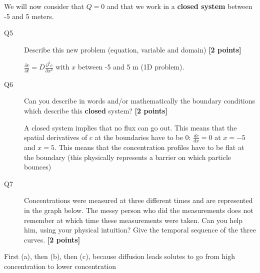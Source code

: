 \documentclass{article}
\newcommand{\ans}[1]{\textcolor{dark-green}{#1}}
\begin{document}
We will now consider that $Q=0$ and that we work in a \textbf{closed system} between -5 and 5 meters. 


\begin{description}
\item [Q5] Describe this new problem (equation, variable and domain) \textbf{[2 points]}

\ans{$\frac{\partial c}{\partial t} = D  \frac{\partial^2 c}{\partial x^2}   $ with $x$ between -5 and 5 m (1D problem). }


\item [Q6] Can you describe in words and/or mathematically the boundary conditions which describe this \textbf{closed} system? \textbf{[2 points]}

\ans{A closed system implies that no flux can go out. This means that the spatial derivatives of $c$ at the boundaries have to be 0: $\frac{dc}{dx} = 0$ at $x = -5$ and $x = 5$. This means that the concentration profiles have to be flat at the boundary (this physically represents a barrier on which particle bounces)}

\item [Q7] Concentrations were measured at three different times and are represented in the graph below. The messy person who did the measurements does not remember at which time these measurements were taken. Can you help him, using your physical intuition? Give the temporal sequence of the three curves.  \textbf{[2 points]}  

\end{description}


\ans{First (a), then (b), then (c), because diffusion leads solutes to go from high concentration to lower concentration}
\end{document}
